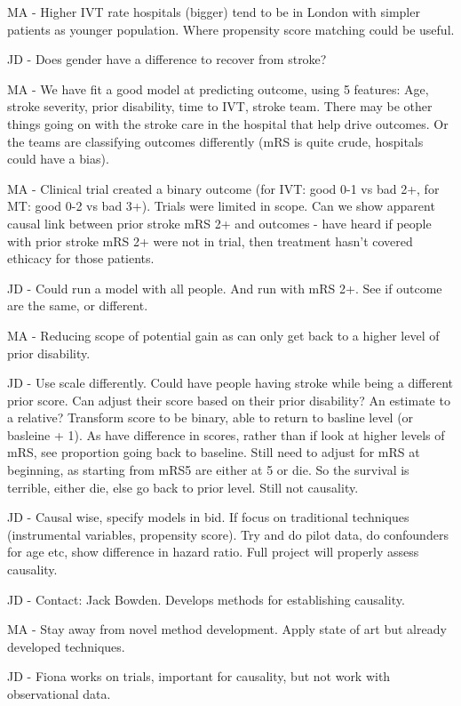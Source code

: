 MA - Higher IVT rate hospitals (bigger) tend to be in London with simpler patients as younger population. Where propensity score matching could be useful.

JD - Does gender have a difference to recover from stroke?

MA - We have fit a good model at predicting outcome, using 5 features: Age, stroke severity, prior disability, time to IVT, stroke team.
There may be other things going on with the stroke care in the hospital that help drive outcomes. Or the teams are classifying outcomes differently (mRS is quite crude, hospitals could have a bias).

MA - Clinical trial created a binary outcome (for IVT: good 0-1 vs bad 2+, for MT: good 0-2 vs bad 3+). Trials  were limited in scope. Can we show apparent causal link between prior stroke mRS 2+ and outcomes - have heard if people with prior stroke mRS 2+ were not in trial, then treatment hasn't covered ethicacy for those patients.

JD - Could run a model with all people. And run with mRS 2+. See if outcome are the same, or different.

MA - Reducing scope of potential gain as can only get back to a higher level of prior disability.

JD - Use scale differently. Could have people having stroke while being a different prior score. Can adjust their score based on their prior disability? An estimate to a relative? Transform score to be binary, able to return to basline level (or basleine + 1). As have difference in scores, rather than if look at higher levels of mRS, see proportion going back to baseline. Still need to adjust for mRS at beginning, as starting from mRS5 are either at 5 or die. So the survival is terrible, either die, else go back to prior level. Still not causality.

JD - Causal wise, specify models in bid. If focus on traditional techniques (instrumental variables, propensity score). Try and do pilot data, do confounders for age etc, show difference in hazard ratio. Full project will properly assess causality.

JD - Contact: Jack Bowden. Develops methods for establishing causality.

MA - Stay away from novel method development. Apply state of art but already developed techniques.

JD - Fiona works on trials, important for causality, but not work with observational data.

